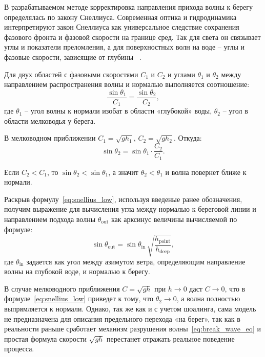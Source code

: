 В разрабатываемом методе корректировка направления прихода волны к берегу определялась по закону Снеллиуса.
Современная оптика и гидродинамика интерпретируют закон Снеллиуса как универсальное следствие сохранения фазового фронта и фазовой скорости на границе сред.
Так для света он связывает углы и показатели преломления, а для поверхностных волн на воде -- углы и фазовые скорости, зависящие от глубины ~\cite{LopezRuiz2015_wave_refraction, JooHaJunEffectOfSeaLevel}.

Для двух областей с фазовыми скоростями $C_1$ и $C_2$ и углами $\theta_1$ и $\theta_2$ между направлением распространения волны и нормалью выполняется соотношение:
\begin{equation}
    \frac{\sin\theta_1}{C_1} = \frac{\sin\theta_2}{C_2},
\end{equation}
где $\theta_1$ -- угол волны к нормали изобат в области «глубокой» воды,
$\theta_2$ -- угол в области мелководья у берега.

В мелководном приближении $C_1 = \sqrt{g h_1}$, $C_2 = \sqrt{g h_2}$.
Откуда:
\begin{equation}\label{eq:snellius_low}
    \sin\theta_2 = \sin\theta_1 \cdot \frac{C_2}{C_1}.
\end{equation}

Если $C_2 < C_1$, то $\sin\theta_2 < \sin\theta_1$, а значит $\theta_2 < \theta_1$ и волна повернет ближе к нормали.

Раскрыв формулу~\eqref{eq:snellius_low}, используя введеные ранее обозначения, получим выражение для вычисления угла между нормалью к береговой линии и направлением подхода волны $\theta_\text{out}$ как арксинус величины вычисляемой по формуле:
\begin{equation}\label{eq:snellius_low_upt}
    \sin \theta_\text{out} = \sin \theta_\text{in}\,\sqrt{\dfrac{h_\text{point}}{h_\text{deep}}},
\end{equation}
где $\theta_\text{in}$ задается как угол между азимутом ветра, определяющим направление волны на глубокой воде, и нормалью к берегу.

В случае мелководного приближения $C = \sqrt{g h}$ при $h \to 0$ даст $C \to 0$, что в формуле~\eqref{eq:snellius_low} приведет к тому, что $\theta_2 \to 0$, а волна полностью выпрямляется к нормали.
Однако, так же как и с учетом шоалинга, сама модель не предназначена для описания предельного перехода «на берег», так как в реальности раньше сработает механизм разрушения волны~\eqref{eq:break_wave_eq} и простая формула скорости $\sqrt{g h}$ перестанет отражать реальное поведение процесса.

